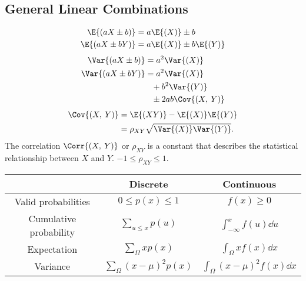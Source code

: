 \documentclass{article}
\begin{document}
\begin{minipage}{126.1962963mm}
\begin{multicols}{2}
        \subsection*{General Linear Combinations}
        \begin{align*}
            \E{\left( aX\pm b \right)}  & = a\E{\left( X \right)} \pm b                     \\
            \E{\left( aX\pm bY \right)} & = a\E{\left( X \right)} \pm b\E{\left( Y \right)}
        \end{align*}
        \begin{align*}
            \Var{\left( aX\pm b \right)} & = a^2\Var{\left( X \right)}                  \\
            \Var{\left( aX\pm bY \right)}   & = a^2\Var{\left( X \right)}                  \\
                                         & \phantom{=} + b^2\Var{\left( Y \right)}      \\
                                         & \phantom{=} \pm 2ab\Cov{\left( X,\: Y \right)}
        \end{align*}
        \begin{align*}
            \Cov{\left( X,\: Y \right)} & = \E{\left( XY \right)} - \E{\left( X \right)}\E{\left( Y \right)} \\
                                        & = \rho_{XY} \sqrt{\Var{\left( X \right)}\Var{\left( Y \right)}}.
        \end{align*}
        The correlation $\Corr{\left( X,\: Y \right)}$ or $\rho_{XY}$ is a constant that describes the statistical relationship
        between $X$ and $Y$. $-1 \leq \rho_{XY} \leq 1$.
    \end{multicols}
    \begin{table}[H]
        \centering
        \begin{tabular}{c | c | c}
            \toprule
                                   & \textbf{Discrete}                            & \textbf{Continuous}                                \\
            \midrule
            Valid probabilities    & $0 \leq p(x) \leq 1$                         & $f(x) \geq 0$                                      \\
            Cumulative probability & $\sum_{u \leq x} p(u)$                       & $\int_{-\infty}^{x} f(u) \dd{u}$                   \\
            Expectation            & $\sum_{\Omega} xp(x)$                        & $\int_{\Omega} xf(x)\dd{x}$                        \\
            Variance               & $\sum_{\Omega} \left( x - \mu \right)^2p(x)$ & $\int_{\Omega} \left( x - \mu \right)^2f(x)\dd{x}$ \\
            \bottomrule
        \end{tabular}
    \end{table}
\end{minipage}\hfill%
\end{document}
